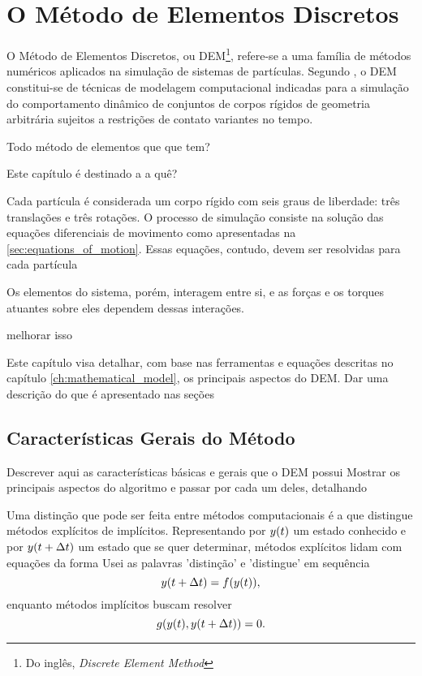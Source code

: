 \chapter{O Método de Elementos Discretos} \label{ch:discrete_element_method}

O Método de Elementos Discretos, ou DEM\footnote{Do inglês, \textit{Discrete Element Method}}, refere-se a uma família de métodos numéricos aplicados na simulação de sistemas de partículas. Segundo , o DEM constitui-se de técnicas de modelagem computacional indicadas para a simulação do comportamento dinâmico de conjuntos de corpos rígidos de geometria arbitrária sujeitos a restrições de contato variantes no tempo.

Todo método de elementos \alert{que que tem?}

Este capítulo é destinado a \alert{a quê?}

Cada partícula é considerada um corpo rígido com seis graus de liberdade: três translações e três rotações. O processo de simulação consiste na solução das equações diferenciais de movimento como apresentadas na \autoref{sec:equations_of_motion}. Essas equações, contudo, devem ser resolvidas para cada partícula

Os elementos do sistema, porém, interagem entre si, e as forças e os torques atuantes sobre eles dependem dessas interações.

\alert{melhorar isso}

Este capítulo visa detalhar, com base nas ferramentas e equações descritas no capítulo \ref{ch:mathematical_model}, os principais aspectos do DEM. \alert{Dar uma descrição do que é apresentado nas seções}

\section{Características Gerais do Método} \alert{Descrever aqui as características básicas e gerais que o DEM possui}
\alert{Mostrar os principais aspectos do algoritmo e passar por cada um deles, detalhando}

Uma distinção que pode ser feita entre métodos computacionais é a que distingue métodos explícitos de implícitos. Representando por \(y\pqty{t}\) um estado conhecido e por \(y\pqty{t+\Dt}\) um estado que se quer determinar, métodos explícitos lidam com equações da forma \alert{Usei as palavras 'distinção' e 'distingue' em sequência}
\begin{equation*}
	y\pqty{t+\Dt} = f\pqty{y\pqty{t}},
\end{equation*}
enquanto métodos implícitos buscam resolver
\begin{equation*}
	g\pqty{y\pqty{t}, y\pqty{t+\Dt}} = 0.
\end{equation*}

